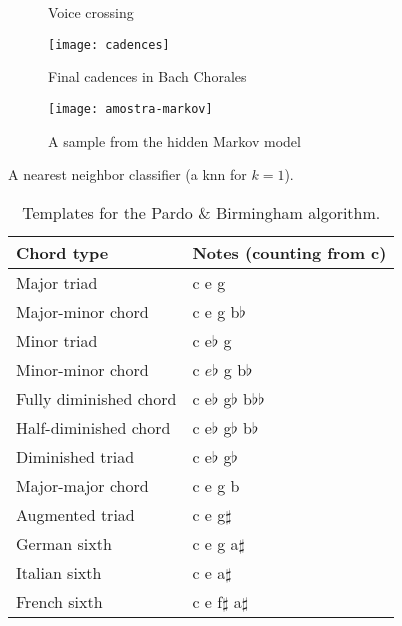\documentclass[a0paper]{sciposter}
\begin{document}
\begin{center}
\begin{multicols}{2}
\begin{figure}[!h]
  \centering
  \caption{Voice crossing}
  \label{fig:coral-003}
\end{figure}

\begin{figure}
  \centering
  \texttt{[image: cadences]}
  \caption{Final cadences in Bach Chorales}
  \label{fig:cadences}
\end{figure}

\begin{figure}[t]
  \centering
  \texttt{[image: amostra-markov]}
  \caption{A sample from the hidden Markov model}
  \label{fig:amostra}
\end{figure}

\begin{algorithm}[t]
  \caption{A nearest neighbor classifier (a knn for $k=1$).}
  \label{alg:knn}
\end{algorithm}

\begin{table}[h]
  \centering
  \begin{small}
    \begin{sc}
      \begin{tabular}[t]{ll} \hline
        Chord type & Notes (counting from c) \\ \hline
        Major triad & c e g \\
        Major-minor chord &  c e g b$\flat$ \\
        Minor triad & c e$\flat$ g \\
        Minor-minor chord & c $e\flat$ g b$\flat$ \\
        Fully diminished chord & c e$\flat$ g$\flat$ b$\flat\flat$ \\
        Half-diminished chord & c e$\flat$ g$\flat$ b$\flat$ \\
        Diminished triad & c e$\flat$ g$\flat$ \\
        Major-major chord & c e g b \\
        Augmented triad & c e g$\sharp$ \\
        German sixth  & c e g a$\sharp$ \\
        Italian sixth & c e a$\sharp$ \\
        French sixth & c e f$\sharp$ a$\sharp$ \\ \hline
      \end{tabular}
    \end{sc}
  \end{small}
  \caption{Templates for the Pardo \& Birmingham algorithm.}
  \label{tab:templates-pardo}
\end{table}



\end{multicols}
\end{center}
\end{document}
